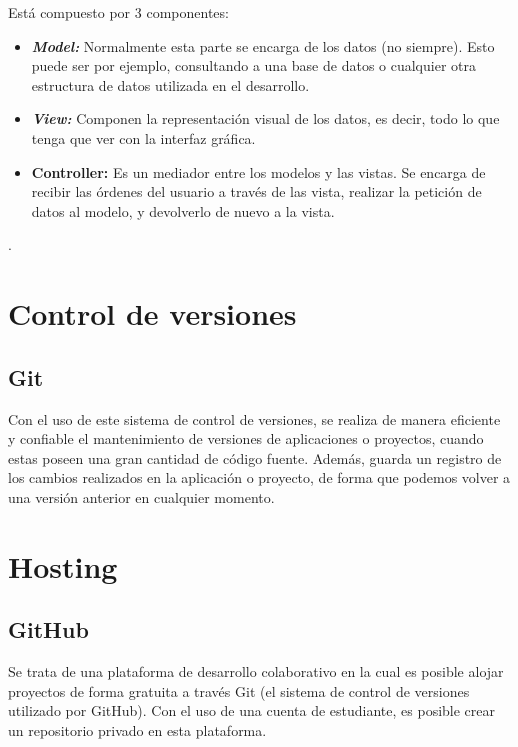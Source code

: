Está compuesto por 3 componentes:
\begin{itemize}
\item
\textit{\textbf{Model: }} Normalmente esta parte se encarga de los datos (no siempre). Esto puede ser por ejemplo, consultando a una base de datos o cualquier otra estructura de datos utilizada en el desarrollo.
\item
\textit{\textbf{View: }} Componen la representación visual de los datos, es decir, todo lo que tenga que ver con la interfaz gráfica.
\item
\textbf{\textbf{Controller: }} Es un mediador entre los modelos y las vistas. Se encarga de recibir las órdenes del usuario a través de las vista, realizar la petición de datos al modelo, y devolverlo de nuevo a la vista.
\end{itemize}


.

\section{Control de versiones}\label{control_de_versiones}

\subsection{Git}\label{git}

Con el uso de este sistema de control de versiones, se realiza de manera eficiente y confiable el mantenimiento de versiones de aplicaciones o proyectos, cuando estas poseen una gran cantidad de código fuente. Además, guarda un registro de los cambios realizados en la aplicación o proyecto, de forma que podemos volver a una versión anterior en cualquier momento.

\section{Hosting}\label{hosting}

\subsection{GitHub}\label{github}

Se trata de una plataforma de desarrollo colaborativo en la cual es posible alojar proyectos de forma gratuita a través Git (el sistema de control de versiones utilizado por GitHub). Con el uso de una cuenta de estudiante, es posible crear un repositorio privado en esta plataforma.

